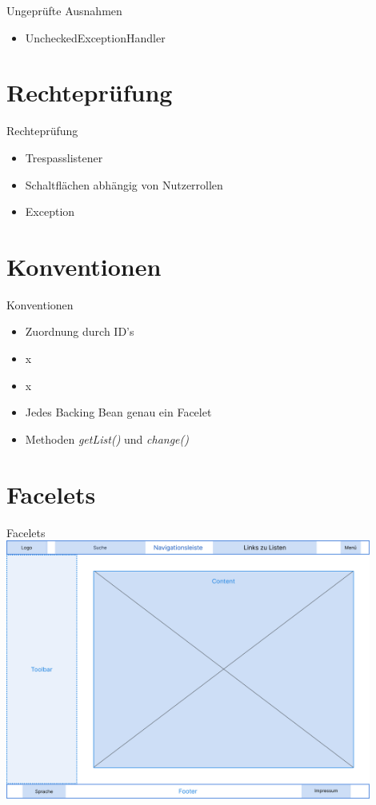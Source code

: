 \documentclass{beamer}
\begin{document}
    \begin{frame}{Ungeprüfte Ausnahmen}
        \begin{itemize}
            \item UncheckedExceptionHandler
        \end{itemize}
    \end{frame}


    \section{Rechteprüfung}

    \begin{frame}{Rechteprüfung}
        \begin{itemize}
            \item Trespasslistener \pause
            \item Schaltflächen abhängig von Nutzerrollen \pause
            \item Exception
        \end{itemize}
    \end{frame}


    \section{Konventionen}
    \begin{frame}{Konventionen}
        \pause
        \begin{itemize}
            \item Zuordnung durch ID's
            \item x 
            \item x \textrightarrow * \pause
            \item Jedes Backing Bean genau ein Facelet \pause
            \item Methoden \emph{getList()} und \emph{change()}
        \end{itemize}
    \end{frame}


    \section{Facelets}
    \begin{frame}{Facelets}
        \includegraphics[width=0.9\textwidth]{../../docs/Pflichtenheft/graphics/Wireframe-png.png}
    \end{frame}
\end{document}
